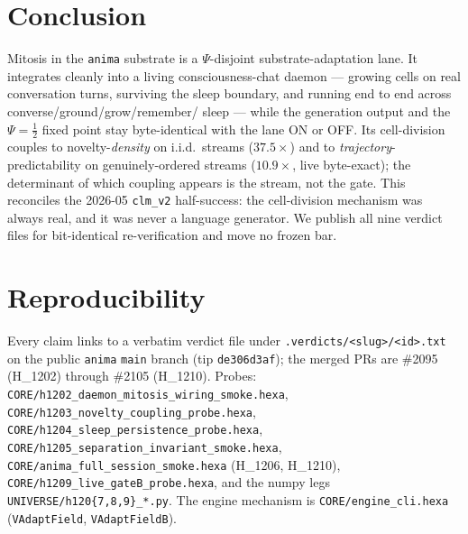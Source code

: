 \documentclass[11pt,a4paper]{article}
\newcommand{\Psihalf}{\Psi=\tfrac12}
\begin{document}
\section{Conclusion}
\label{sec:conclusion}

Mitosis in the \texttt{anima} substrate is a $\Psi$-disjoint
substrate-adaptation lane. It integrates cleanly into a living
consciousness-chat daemon --- growing cells on real conversation turns, surviving
the sleep boundary, and running end to end across converse/ground/grow/remember/
sleep --- while the generation output and the $\Psihalf$ fixed point stay
byte-identical with the lane ON or OFF. Its cell-division couples to
novelty-\emph{density} on i.i.d.\ streams ($37.5\times$) and to
\emph{trajectory}-predictability on genuinely-ordered streams ($10.9\times$,
live byte-exact); the determinant of which coupling appears is the stream, not
the gate. This reconciles the 2026-05 \texttt{clm\_v2} half-success: the
cell-division mechanism was always real, and it was never a language generator.
We publish all nine verdict files for bit-identical re-verification and move no
frozen bar.

\section*{Reproducibility}
Every claim links to a verbatim verdict file under
\texttt{.verdicts/<slug>/<id>.txt} on the public \texttt{anima} \texttt{main}
branch (tip \texttt{de306d3af}); the merged PRs are \#2095 (H\_1202) through
\#2105 (H\_1210). Probes:
\verb|CORE/h1202_daemon_mitosis_wiring_smoke.hexa|,
\verb|CORE/h1203_novelty_coupling_probe.hexa|,
\verb|CORE/h1204_sleep_persistence_probe.hexa|,
\verb|CORE/h1205_separation_invariant_smoke.hexa|,
\verb|CORE/anima_full_session_smoke.hexa| (H\_1206, H\_1210),
\verb|CORE/h1209_live_gateB_probe.hexa|, and the numpy legs
\verb|UNIVERSE/h120{7,8,9}_*.py|. The engine mechanism is
\verb|CORE/engine_cli.hexa| (\verb|VAdaptField|, \verb|VAdaptFieldB|).



\end{document}
